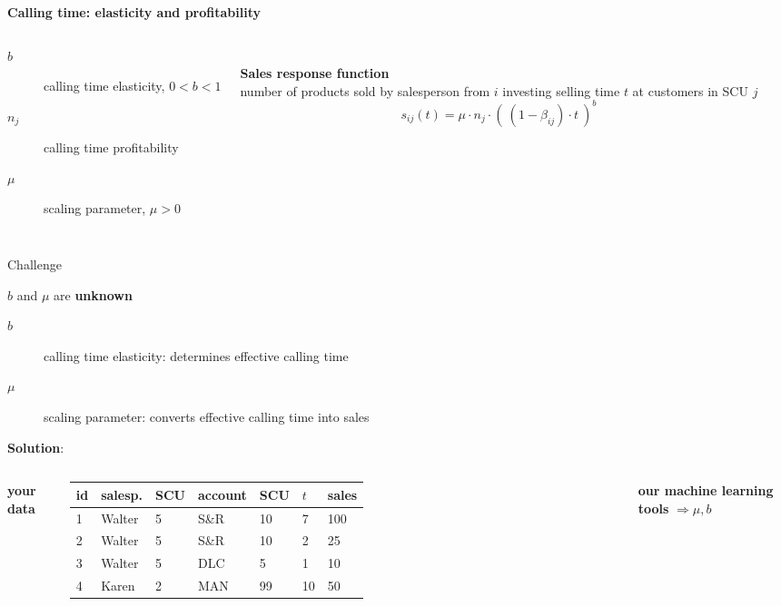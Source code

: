 \begin{frame}{\textbf{Calling time: elasticity and profitability}}
\begin{columns}[T]
\centering

\begin{description}
  \item[$b$] calling time elasticity, $0<b<1$
  \item[$n_j$] calling time profitability
  \item[$\mu$] scaling parameter, $\mu>0$
\end{description}\\
\textbf{Sales response function}\\
number of products sold by salesperson from $i$ investing selling time $t$ at customers in SCU $j$ 
\[s_{ij}(t) = \mu \cdot n_j \cdot (\ (1-\beta_{ij})\cdot t \ ) ^b\]
\end{columns}
\end{frame}

\begin{frame}{Challenge }
\begin{alertblock}{$b$ and  $\mu$ are \textbf{unknown}}
\begin{description}
  \item[$b$] calling time elasticity: determines effective calling time
  \item[$\mu$] scaling parameter: converts effective calling time into sales
\end{description}
\end{alertblock}
\centering
\textbf{Solution}:\\ \vfill 
\begin{columns}[c]
\centering
\textbf{your data}
\begin{tabular}{@{}lllllll@{}}
\toprule
id & salesp. & SCU & account & SCU & $t$ & sales \\ \midrule
1  & Walter  & 5   & S\&R    & 10  & 7   & 100   \\
2  & Walter  & 5   & S\&R    & 10  & 2   & 25    \\
3  & Walter  & 5   & DLC     & 5   & 1   & 10    \\
4  & Karen   & 2   & MAN     & 99  & 10  & 50    \\ \bottomrule
\end{tabular}
\textbf{our machine learning tools} $\Rightarrow \mu, b$
\end{columns}
\end{frame}

